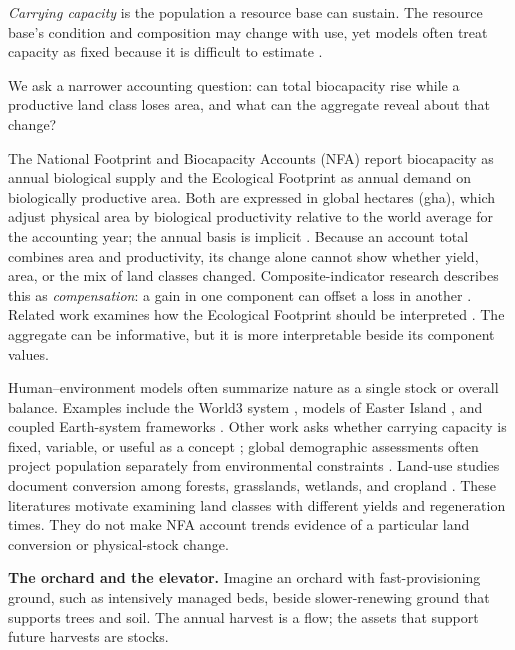 \documentclass[preprint,12pt,authoryear]{elsarticle}
\begin{document}
\emph{Carrying capacity} is the population a resource base can sustain. The resource base's condition and composition may change with use, yet models often treat capacity as fixed because it is difficult to estimate \citep{Cohen1995}.

We ask a narrower accounting question: can total biocapacity rise while a productive land class loses area, and what can the aggregate reveal about that change?

The National Footprint and Biocapacity Accounts (NFA) report biocapacity as annual biological supply and the Ecological Footprint as annual demand on biologically productive area. Both are expressed in global hectares (gha), which adjust physical area by biological productivity relative to the world average for the accounting year; the annual basis is implicit \citep{GFNStandards2009,GFNGuidebook2019}. Because an account total combines area and productivity, its change alone cannot show whether yield, area, or the mix of land classes changed. Composite-indicator research describes this as \emph{compensation}: a gain in one component can offset a loss in another \citep{Nardo2008,Becker2017,Fischer2022}. Related work examines how the Ecological Footprint should be interpreted \citep{Blomqvist2013,GiampietroSaltelli2014,vdBerghGrazi2015,Galli2016}. The aggregate can be informative, but it is more interpretable beside its component values.

Human--environment models often summarize nature as a single stock or overall balance. Examples include the World3 system \citep{Meadows1972,Meadows1974,Meadows2004}, models of Easter Island \citep{BranderTaylor1998,Anderies2000}, and coupled Earth-system frameworks \citep{Motesharrei2016,Donges2017,CalvinBondLamberty2018,HendersonLoreau2018}. Other work asks whether carrying capacity is fixed, variable, or useful as a concept \citep{Cohen1995,vdBerghRietveld2004,Simon1996,Meyer1994,MeyerAusubel1999,Dasgupta2021}; global demographic assessments often project population separately from environmental constraints \citep{UN2022}. Land-use studies document conversion among forests, grasslands, wetlands, and cropland \citep{Haberl2007,Krausmann2013,Erb2017}. These literatures motivate examining land classes with different yields and regeneration times. They do not make NFA account trends evidence of a particular land conversion or physical-stock change.

\begin{samepage}
\textbf{The orchard and the elevator.} Imagine an orchard with fast-provisioning ground, such as intensively managed beds, beside slower-renewing ground that supports trees and soil. The annual harvest is a flow; the assets that support future harvests are stocks.\par
\end{samepage}
\end{document}
